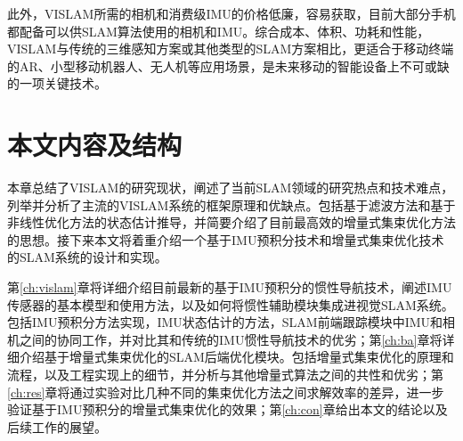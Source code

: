 此外，VISLAM所需的相机和消费级IMU的价格低廉，容易获取，目前大部分手机都配备可以供SLAM算法使用的相机和IMU。综合成本、体积、功耗和性能，VISLAM与传统的三维感知方案或其他类型的SLAM方案相比，更适合于移动终端的AR、小型移动机器人、无人机等应用场景，是未来移动的智能设备上不可或缺的一项关键技术。





\section{本文内容及结构}

本章总结了VISLAM的研究现状，阐述了当前SLAM领域的研究热点和技术难点，列举并分析了主流的VISLAM系统的框架原理和优缺点。包括基于滤波方法和基于非线性优化方法的状态估计推导，并简要介绍了目前最高效的增量式集束优化方法的思想。接下来本文将着重介绍一个基于IMU预积分技术和增量式集束优化技术的SLAM系统的设计和实现。

第\ref{ch:vislam}章将详细介绍目前最新的基于IMU预积分的惯性导航技术，阐述IMU传感器的基本模型和使用方法，以及如何将惯性辅助模块集成进视觉SLAM系统。包括IMU预积分方法实现，IMU状态估计的方法，SLAM前端跟踪模块中IMU和相机之间的协同工作，并对比其和传统的IMU惯性导航技术的优劣；第\ref{ch:ba}章将详细介绍基于增量式集束优化的SLAM后端优化模块。包括增量式集束优化的原理和流程，以及工程实现上的细节，并分析与其他增量式算法之间的共性和优劣；第\ref{ch:res}章将通过实验对比几种不同的集束优化方法之间求解效率的差异，进一步验证基于IMU预积分的增量式集束优化的效果；第\ref{ch:con}章给出本文的结论以及后续工作的展望。

